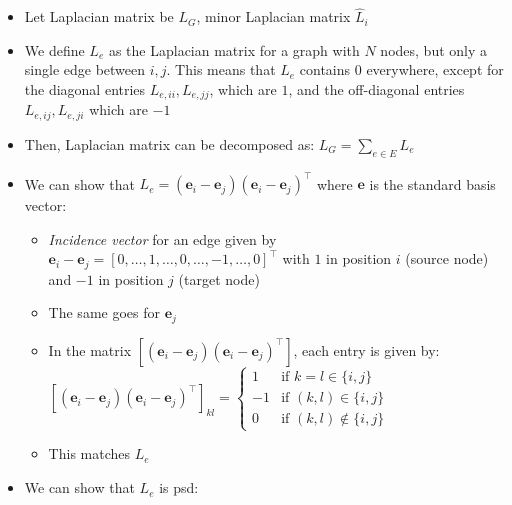 \begin{itemize}
    \item Let Laplacian matrix be $L_G$, minor Laplacian matrix $\hat{L}_i$
    \item We define $L_e$ as the Laplacian matrix for a graph with $N$ nodes, but only a single edge between $i,j$. This means that $L_e$ contains $0$ everywhere, except for the diagonal entries $L_{e,ii}, L_{e,jj}$, which are $1$, and the off-diagonal entries $ L_{e,ij},L_{e,ji}$ which are $-1$
    \item Then, Laplacian matrix can be decomposed as: $L_G = \sum_{e \in E} L_e$
    \item We can show that $L_e = (\boldsymbol{e}_i - \boldsymbol{e}_j)(\boldsymbol{e}_i - \boldsymbol{e}_j)^\intercal$ where $\boldsymbol{e}$ is the standard basis vector:
    \begin{itemize}
        \item \emph{Incidence vector} for an edge given by $
        \boldsymbol{e}_i - \boldsymbol{e}_j = [0, \ldots, 1, \ldots, 0, \ldots, -1, \ldots, 0]^\intercal
        $ with $ 1 $ in position $i$ (source node) and $ -1 $ in position $j$ (target node)
        \item The same goes for $\boldsymbol{e}_j$
        \item In the matrix $\left[ (\boldsymbol{e}_i - \boldsymbol{e}_j)(\boldsymbol{e}_i - \boldsymbol{e}_j)^\intercal \right]$, each entry is given by: 
        $
        \left[ (\boldsymbol{e}_i - \boldsymbol{e}_j)(\boldsymbol{e}_i - \boldsymbol{e}_j)^\intercal \right]_{kl} =
        \begin{cases}
        1 & \text{if } k = l \in \{i, j\} \\
        -1 & \text{if } (k, l) \in \{i, j\} \\
        0 & \text{if } (k, l) \notin \{i, j\}
        \end{cases}
        $
        \item This matches $L_e$
    \end{itemize}
    \item We can show that $L_e$ is psd:
\end{itemize}
